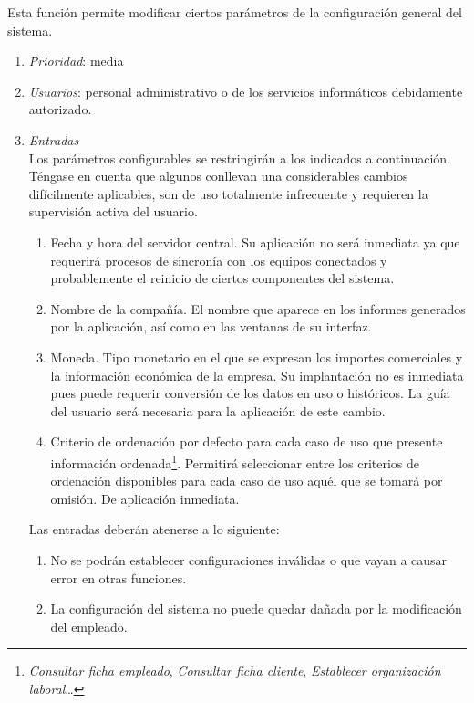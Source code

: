   \label{fun:configSystem}
	Esta función permite modificar ciertos parámetros de la configuración general del sistema.

	\begin{enumerate}
		\item \textit{Prioridad}: media
		\item \textit{Usuarios}: personal administrativo o de los servicios informáticos debidamente autorizado.

		\item \textit{Entradas} \\

			Los parámetros configurables se restringirán a los indicados a continuación. Téngase en cuenta que algunos conllevan una considerables cambios difícilmente aplicables, son de uso totalmente infrecuente y requieren la supervisión activa del usuario.
			\begin{enumerate}
				\item Fecha y hora del servidor central. Su aplicación no será inmediata ya que requerirá procesos de sincronía con los equipos conectados y probablemente el reinicio de ciertos componentes del sistema.
				\item Nombre de la compañía. El nombre que aparece en los informes generados por la aplicación, así como en las ventanas de su interfaz.
				\item Moneda. Tipo monetario en el que se expresan los importes comerciales y la información económica de la empresa. Su implantación no es inmediata pues puede requerir conversión de los datos en uso o históricos. La guía del usuario será necesaria para la aplicación de este cambio.
				\item Criterio de ordenación por defecto para cada caso de uso que presente información ordenada\footnote{\textit{Consultar ficha empleado}, \textit{Consultar ficha cliente}, \textit{Establecer organización laboral}\ldots}. Permitirá seleccionar entre los criterios de ordenación disponibles para cada caso de uso aquél que se tomará por omisión. De aplicación inmediata.
			\end{enumerate}

			Las entradas deberán atenerse a lo siguiente:
			\begin{enumerate}
				\item No se podrán establecer configuraciones inválidas o que vayan a causar error en otras funciones.
				\item La configuración del sistema no puede quedar dañada por la modificación del empleado.
			\end{enumerate}


\end{enumerate}
